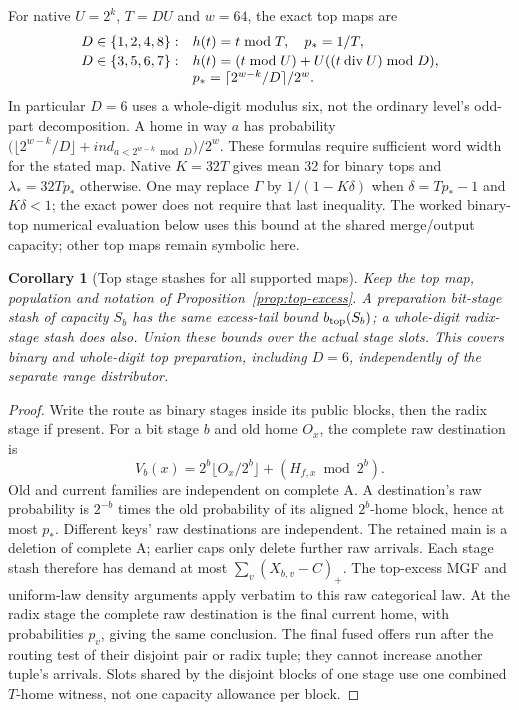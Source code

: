 \documentclass[11pt]{article}
\newtheorem{corollary}[theorem]{Corollary}
\theoremstyle{definition}
\theoremstyle{remark}
\begin{document}
For native $U=2^k$, $T=DU$ and $w=64$, the exact top maps are
\[
\begin{array}{ll}
 D\in\{1,2,4,8\}:&h(t)=t\bmod T,\quad p_*=1/T,\\[2pt]
 D\in\{3,5,6,7\}:&h(t)=(t\bmod U)+U((t\mathbin{\rm div}U)\bmod D),\\
 &p_*={\lceil2^{w-k}/D\rceil}/{2^w}.
\end{array}
\]
In particular $D=6$ uses a whole-digit modulus six, not the ordinary
level's odd-part decomposition. A home in way $a$ has probability
$\bigl(\lfloor2^{w-k}/D\rfloor+ind_{a<2^{w-k}\bmod D}\bigr)/2^w$.
These formulas require sufficient word width for the stated map. Native
$K=32T$ gives mean 32 for binary tops and $\lambda_*=32Tp_*$ otherwise.
One may replace $\Gamma$ by $1/(1-K\delta)$ when
$\delta=Tp_*-1$ and $K\delta<1$; the exact power does not require that
last inequality. The worked binary-top numerical evaluation below uses this bound at the
shared merge/output capacity; other top maps remain symbolic here.

\begin{corollary}[Top stage stashes for all supported maps]
\label{cor:top-stages}
Keep the top map, population and notation of
Proposition~\ref{prop:top-excess}. A preparation bit-stage stash of
capacity $S_b$ has the same excess-tail bound $b_{\rm top}(S_b)$; a
whole-digit radix-stage stash does also. Union these bounds over the
actual stage slots. This covers binary and whole-digit top preparation,
including $D=6$, independently of the separate range distributor.
\end{corollary}
\begin{proof}
Write the route as binary stages inside its public blocks, then the radix
stage if present. For a bit stage $b$ and old home $O_x$, the complete
raw destination is
\[
 V_b(x)=2^b\lfloor O_x/2^b\rfloor+(H_{f,x}\bmod2^b).
\]
Old and current families are independent on complete A. A destination's
raw probability is $2^{-b}$ times the old probability of its aligned
$2^b$-home block, hence at most $p_*$. Different keys' raw destinations
are independent. The retained main is a deletion of complete A; earlier
caps only delete further raw arrivals. Each stage stash therefore has
demand at most $\sum_v(X_{b,v}-C)_+$. The top-excess MGF and uniform-law
density arguments apply verbatim to this raw categorical law. At the
radix stage the complete raw destination is the final current home, with
probabilities $p_v$, giving the same conclusion. The final fused offers
run after the routing test of their disjoint pair or radix tuple; they
cannot increase another tuple's arrivals. Slots shared by the disjoint
blocks of one stage use one combined $T$-home witness, not one capacity
allowance per block.
\end{proof}
\end{document}
